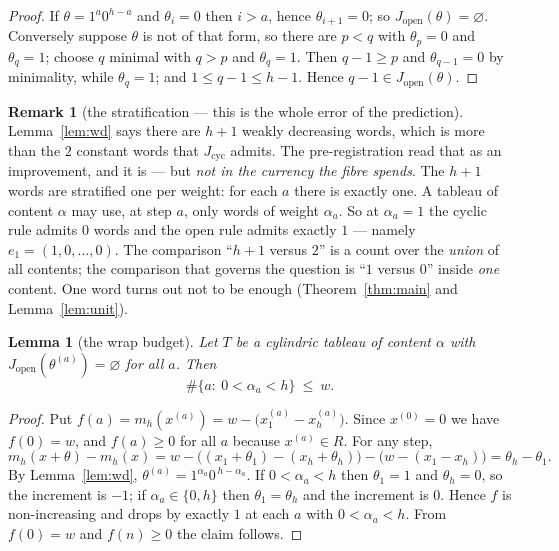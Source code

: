 \documentclass[11pt]{article}
\theoremstyle{plain}
\newtheorem{lemma}[theorem]{Lemma}
\theoremstyle{definition}
\newtheorem{remark}[theorem]{Remark}
\newcommand{\Jop}{J_{\mathrm{open}}}
\newcommand{\Jcyc}{J_{\mathrm{cyc}}}
\begin{document}
\begin{proof}
If $\theta=1^a0^{h-a}$ and $\theta_i=0$ then $i>a$, hence $\theta_{i+1}=0$; so
$\Jop(\theta)=\varnothing$. Conversely suppose $\theta$ is not of that form, so there are
$p<q$ with $\theta_p=0$ and $\theta_q=1$; choose $q$ minimal with $q>p$ and $\theta_q=1$. Then
$q-1\ge p$ and $\theta_{q-1}=0$ by minimality, while $\theta_q=1$; and $1\le q-1\le h-1$. Hence
$q-1\in\Jop(\theta)$.
\end{proof}

\begin{remark}[the stratification --- this is the whole error of the prediction]\label{rem:strat}
Lemma~\ref{lem:wd} says there are $h+1$ weakly decreasing words, which is more than the $2$
constant words that $\Jcyc$ admits. The pre-registration read that as an improvement, and it is
--- but \emph{not in the currency the fibre spends}. The $h+1$ words are stratified one per
weight: for each $a$ there is exactly one. A tableau of content $\alpha$ may use, at step $a$,
only words of weight $\alpha_a$. So at $\alpha_a=1$ the cyclic rule admits $0$ words and the open
rule admits exactly $1$ --- namely $e_1=(1,0,\dots,0)$. The comparison ``$h+1$ versus $2$'' is a
count over the \emph{union} of all contents; the comparison that governs the question is
``$1$ versus $0$'' inside \emph{one} content. One word turns out not to be enough
(Theorem~\ref{thm:main} and Lemma~\ref{lem:unit}).
\end{remark}

\begin{lemma}[the wrap budget]\label{lem:budget}
Let $T$ be a cylindric tableau of content $\alpha$ with $\Jop(\theta^{(a)})=\varnothing$ for all
$a$. Then
\[
\#\{a:\ 0<\alpha_a<h\}\ \le\ w .
\]
\end{lemma}

\begin{proof}
Put $f(a)=m_h(x^{(a)})=w-\bigl(x^{(a)}_1-x^{(a)}_h\bigr)$. Since $x^{(0)}=0$ we have $f(0)=w$,
and $f(a)\ge0$ for all $a$ because $x^{(a)}\in R$. For any step,
\[
m_h(x+\theta)-m_h(x)
= w-\bigl((x_1+\theta_1)-(x_h+\theta_h)\bigr)-\bigl(w-(x_1-x_h)\bigr)
= \theta_h-\theta_1 .
\]
By Lemma~\ref{lem:wd}, $\theta^{(a)}=1^{\alpha_a}0^{\,h-\alpha_a}$. If $0<\alpha_a<h$ then
$\theta_1=1$ and $\theta_h=0$, so the increment is $-1$; if $\alpha_a\in\{0,h\}$ then
$\theta_1=\theta_h$ and the increment is $0$. Hence $f$ is non-increasing and drops by exactly
$1$ at each $a$ with $0<\alpha_a<h$. From $f(0)=w$ and $f(n)\ge0$ the claim follows.
\end{proof}
\end{document}
